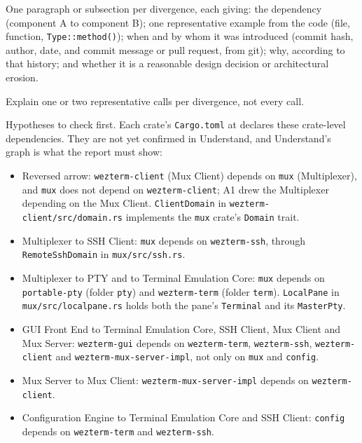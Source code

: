 \begin{requirements}
  \item One paragraph or subsection per divergence, each giving: the dependency (component A to component B); one representative example from the code (file, function, \texttt{Type::method()}); when and by whom it was introduced (commit hash, author, date, and commit message or pull request, from git); why, according to that history; and whether it is a reasonable design decision or architectural erosion.
  \item Explain one or two representative calls per divergence, not every call.
  \item Hypotheses to check first. Each crate's \texttt{Cargo.toml} at \pinnedcommit{} declares these crate-level dependencies. They are not yet confirmed in Understand, and Understand's graph is what the report must show:
  \begin{itemize}[itemsep=1pt,topsep=1pt]
    \item Reversed arrow: \texttt{wezterm-client} (Mux Client) depends on \texttt{mux} (Multiplexer), and \texttt{mux} does not depend on \texttt{wezterm-client}; A1 drew the Multiplexer depending on the Mux Client. \texttt{ClientDomain} in \texttt{wezterm-client/src/domain.rs} implements the \texttt{mux} crate's \texttt{Domain} trait.
    \item Multiplexer to SSH Client: \texttt{mux} depends on \texttt{wezterm-ssh}, through \texttt{RemoteSshDomain} in \texttt{mux/src/ssh.rs}.
    \item Multiplexer to PTY and to Terminal Emulation Core: \texttt{mux} depends on \texttt{portable-pty} (folder \texttt{pty}) and \texttt{wezterm-term} (folder \texttt{term}). \texttt{LocalPane} in \texttt{mux/src/localpane.rs} holds both the pane's \texttt{Terminal} and its \texttt{MasterPty}.
    \item GUI Front End to Terminal Emulation Core, SSH Client, Mux Client and Mux Server: \texttt{wezterm-gui} depends on \texttt{wezterm-term}, \texttt{wezterm-ssh}, \texttt{wezterm-client} and \texttt{wezterm-mux-server-impl}, not only on \texttt{mux} and \texttt{config}.
    \item Mux Server to Mux Client: \texttt{wezterm-mux-server-impl} depends on \texttt{wezterm-client}.
    \item Configuration Engine to Terminal Emulation Core and SSH Client: \texttt{config} depends on \texttt{wezterm-term} and \texttt{wezterm-ssh}.
  \end{itemize}
\end{requirements}

